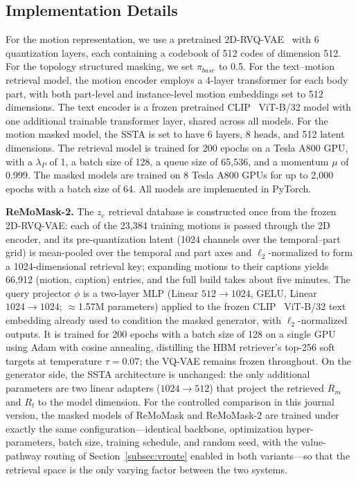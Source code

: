 \documentclass[10pt,journal,compsoc]{IEEEtran}
\newcommand{\myparagraph}[1]{\textbf{#1}\hspace{1.8ex}}
\begin{document}
\subsection{Implementation Details}
For the motion representation, we use a pretrained 2D-RVQ-VAE~\cite{mogents} with 6 quantization layers, each containing a codebook of 512 codes of dimension 512.
For the topology structured masking, we set $\pi_{base}$ to 0.5.
For the text–motion retrieval model, the motion encoder employs a 4-layer transformer for each body part, with both part-level and instance-level motion embeddings set to 512 dimensions. 
The text encoder is a frozen pretrained CLIP~\cite{clip} ViT-B/32 model with one additional trainable transformer layer, shared across all models. 
For the motion masked model, the SSTA is set to have 6 layers, 8 heads, and 512 latent dimensions. The retrieval model is trained for 200 epochs on a Tesla A800 GPU, with a $\lambda_{P}$ of 1, a batch size of 128, a queue size of 65,536, and a momentum $\mu$ of 0.999.
The masked models are trained on 8 Tesla A800 GPUs for up to 2,000 epochs with a batch size of 64. All models are implemented in PyTorch.

\noindent \myparagraph{ReMoMask-2.}
The $z_e$ retrieval database is constructed once from the frozen 2D-RVQ-VAE: each of the 23,384 training motions is passed through the 2D encoder, and its pre-quantization latent (1024 channels over the temporal--part grid) is mean-pooled over the temporal and part axes and $\ell_2$-normalized to form a 1024-dimensional retrieval key; expanding motions to their captions yields 66,912 (motion, caption) entries, and the full build takes about five minutes. The query projector $\phi$ is a two-layer MLP (Linear $512{\to}1024$, GELU, Linear $1024{\to}1024$; $\approx$1.57M parameters) applied to the frozen CLIP~\cite{clip} ViT-B/32 text embedding already used to condition the masked generator, with $\ell_2$-normalized outputs. It is trained for 200 epochs with a batch size of 128 on a single GPU using Adam with cosine annealing, distilling the HBM retriever's top-256 soft targets at temperature $\tau = 0.07$; the VQ-VAE remains frozen throughout. On the generator side, the SSTA architecture is unchanged: the only additional parameters are two linear adapters ($1024 \to 512$) that project the retrieved $R_m$ and $R_t$ to the model dimension. For the controlled comparison in this journal version, the masked models of ReMoMask and ReMoMask-2 are trained under exactly the same configuration---identical backbone, optimization hyper-parameters, batch size, training schedule, and random seed, with the value-pathway routing of Section~\ref{subsec:vroute} enabled in both variants---so that the retrieval space is the only varying factor between the two systems.
\end{document}
